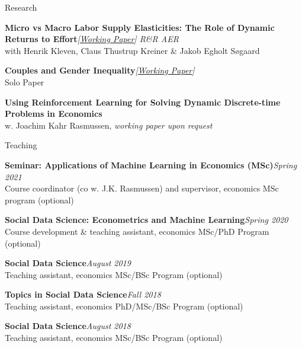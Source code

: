 \documentclass[
	11pt, %
]{resume} %
\begin{document}
\begin{rSection}{Research}

    \textbf{Micro vs Macro Labor Supply Elasticities: The Role of Dynamic Returns to Effort}\hfill \textit{[\href{https://www.nber.org/papers/w31549}{Working Paper}] R\&R AER} \\
    with Henrik Kleven, Claus Thustrup Kreiner \& Jakob Egholt Søgaard

    \textbf{Couples and Gender Inequality}\hfill \textit{[\href{https://ssrn.com/abstract=4697847}{Working Paper}]} \\
    Solo Paper

    \textbf{Using Reinforcement Learning for Solving Dynamic Discrete-time Problems in Economics} \\
    w. Joachim Kahr Rasmussen, \textit{working paper upon request}
\end{rSection}

\begin{rSection}{Teaching}

    \textbf{Seminar: Applications of Machine Learning in Economics (MSc)}\hfill \textit{Spring 2021} \\
    Course coordinator (co w. J.K. Rasmussen) and supervisor, economics MSc program (optional)

    \textbf{Social Data Science: Econometrics and Machine Learning}\hfill \textit{Spring 2020} \\
    Course development \& teaching assistant, economics MSc/PhD Program (optional)

    \textbf{Social Data Science}\hfill \textit{August 2019} \\
    Teaching assistant, economics MSc/BSc Program (optional)

    \textbf{Topics in Social Data Science}\hfill \textit{Fall 2018} \\
    Teaching assistant, economics PhD/MSc/BSc Program (optional)

    \textbf{Social Data Science}\hfill \textit{August 2018} \\
    Teaching assistant, economics MSc/BSc Program (optional)

\end{rSection}


\newpage
\end{document}
